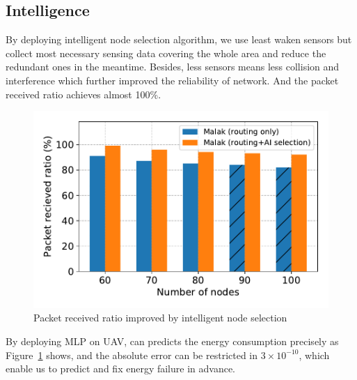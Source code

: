 \subsection{Intelligence}

By deploying intelligent node selection algorithm, we use least waken sensors
but collect most necessary sensing data covering the whole area and reduce the
redundant ones in the meantime. Besides, less sensors means less collision and
interference which further improved the reliability of network. And the packet
received ratio achieves almost 100\%.

\begin{figure}[htbp]
	\centering
	\includegraphics[width=.95\columnwidth]{Figure/ai_selection}
	\vspace{-0.1in}
	\caption{Packet received ratio improved by intelligent node selection
		\textnormal{
		}}
	\label{fig:ai_selection}
\end{figure}

By deploying MLP on UAV, {\sdn} can predicts the energy consumption precisely as
Figure~\ref{fig:ai_selection} shows, and the absolute error can be restricted in
$3\times10^{-10}$, which enable us to predict and fix energy failure in advance.

